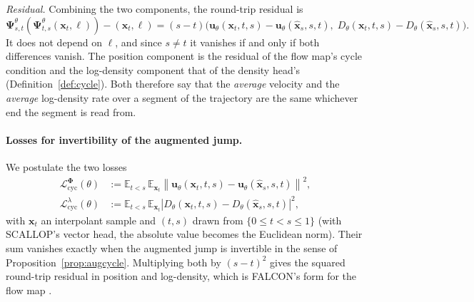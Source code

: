 \documentclass[11pt,a4paper]{article}
\numberwithin{equation}{section}     %
\theoremstyle{plain}        %
\theoremstyle{definition}   %
\theoremstyle{remark}       %
\begin{document}
\emph{Residual.} Combining the two components, the round-trip residual is
\[
\boldsymbol{\Psi}^\theta_{s,t}\left(\boldsymbol{\Psi}^\theta_{t,s}(\mathbf{x}_t,\ell)\right)-(\mathbf{x}_t,\ell)=(s-t)\Big(\mathbf{u}_\theta(\mathbf{x}_t,t,s)-\mathbf{u}_\theta(\hat{\mathbf{x}}_s,s,t),\;D_\theta(\mathbf{x}_t,t,s)-D_\theta(\hat{\mathbf{x}}_s,s,t)\Big).
\]
It does not depend on $\ell$, and since $s\neq t$ it vanishes if and only if both differences vanish. The position component is the residual of the flow map's cycle condition and the log-density component that of the density head's (Definition~\ref{def:cycle}). Both therefore say that the \emph{average} velocity and the \emph{average} log-density rate over a segment of the trajectory are the same whichever end the segment is read from.

\paragraph{Losses for invertibility of the augmented jump.} We postulate the two losses
\begin{align}
\mathcal{L}^{\boldsymbol{\Phi}}_{\mathrm{cyc}}(\theta)&:=\mathbb{E}_{t<s}\,\mathbb{E}_{\mathbf{x}_t}\left\|\mathbf{u}_\theta(\mathbf{x}_t,t,s)-\mathbf{u}_\theta(\hat{\mathbf{x}}_s,s,t)\right\|^2,\label{eq:cycphi}\\
\mathcal{L}^{\lambda}_{\mathrm{cyc}}(\theta)&:=\mathbb{E}_{t<s}\,\mathbb{E}_{\mathbf{x}_t}\left|D_\theta(\mathbf{x}_t,t,s)-D_\theta(\hat{\mathbf{x}}_s,s,t)\right|^2,\label{eq:cyclambda}
\end{align}
with $\mathbf{x}_t$ an interpolant sample and $(t,s)$ drawn from $\{0\le t<s\le1\}$ (with SCALLOP's vector head, the absolute value becomes the Euclidean norm). Their sum vanishes exactly when the augmented jump is invertible in the sense of Proposition~\ref{prop:augcycle}. Multiplying both by $(s-t)^2$ gives the squared round-trip residual in position and log-density, which is FALCON's form for the flow map \citep{rehman2026}.

\newpage
\end{document}
